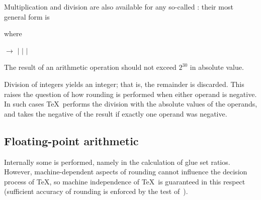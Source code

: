\documentclass{book}
\begin{document}
Multiplication and division are also available for any so-called
: their most general form is
\begin{disp}
\end{disp} where
\begin{disp} $\longrightarrow$
 $|$ \nl
\indent $|$  $|$ \end{disp}

The result of an arithmetic operation should not exceed
$2^{30}$ in absolute value.

Division of integers yields an integer; that is, the remainder
is discarded. This raises the question of how rounding is performed
when either operand is negative. In such cases \TeX\ performs
the division with the absolute values of the operands, and
takes the negative of the result if exactly one operand was negative.

\subsection{Floating-point arithmetic}

Internally some 
is performed, namely
in the calculation of glue set ratios.
However, machine-dependent aspects of rounding cannot
influence the decision process of \TeX, so machine independence
of \TeX\ is guaranteed in this respect (sufficient
accuracy of rounding is enforced by the  test of~\cite{K:trip}).
\end{document}
